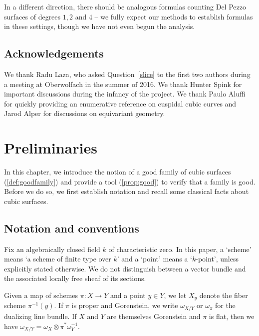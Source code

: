 \documentclass[12pt,reqno]{amsart}
\renewcommand{\k}{k}
\renewcommand{\to}{{\longrightarrow}}
\numberwithin{equation}{section}
\begin{document}
In a different direction, there should be analogous formulas counting
Del Pezzo surfaces of degrees $1,2$ and $4$ -- we fully expect our
methods to establish formulas in these settings, though we have not
even begun the analysis.  



\subsection{Acknowledgements}
We thank Radu Laza, who asked Question~\ref{slice} to the first two
authors during a meeting at Oberwolfach in the summer of 2016.  We
thank Hunter Spink for important discussions during the infancy
of the project.  We thank Paulo Aluffi for quickly providing an
enumerative reference on cuspidal cubic curves and Jarod Alper for discussions on equivariant geometry.



  




\section{Preliminaries}
\label{sec:good}

In this chapter, we introduce the notion of a good family of cubic
surfaces (\autoref{def:goodfamily}) and provide a tool
(\autoref{prop:good}) to verify that a family is good.  Before we do
so, we first establish notation and recall some classical facts about
cubic surfaces.

\subsection{Notation and conventions}
\label{sec:notation-conventions}
Fix an algebraically closed field $\k$ of characteristic zero.  In
this paper, a `scheme' means `a scheme of finite type over $\k$' and a
`point' means a `$\k$-point', unless explicitly stated otherwise.  We
do not distinguish between a vector bundle and the associated locally
free sheaf of its sections.

Given a map of schemes $\pi \colon X \to Y$ and a point $y \in Y$, we
let $X_y$ denote the fiber scheme $\pi^{-1}(y)$.  If $\pi$ is proper
and Gorenstein, we write $\omega_{X/Y}$ or $\omega_\pi$ for the
dualizing line bundle.  If $X$ and $Y$ are themselves Gorenstein and
$\pi$ is flat, then we have
$\omega_{X/Y} = \omega_X \otimes \pi^*\omega_Y^{-1}$.
\end{document}
